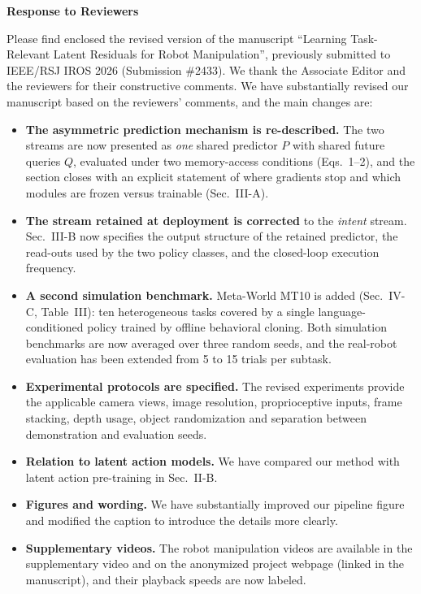 \documentclass[11pt,a4paper]{article}
\begin{document}
\begin{center}
{\Large\bfseries Response to Reviewers}\\[4pt]
\end{center}

\vspace{6pt}
\noindent
Please find enclosed the revised version of the manuscript ``Learning Task-Relevant Latent Residuals for Robot Manipulation'', previously submitted to IEEE/RSJ IROS 2026 (Submission \#2433). We thank the Associate Editor and the reviewers for their constructive comments. We have substantially revised our manuscript based on the reviewers' comments, and the main changes are:

\begin{itemize}[leftmargin=1.4em,itemsep=2pt,topsep=4pt]
  \item \textbf{The asymmetric prediction mechanism is re-described.} The two streams are now presented as \emph{one} shared predictor $P$ with shared future queries $Q$, evaluated under two memory-access conditions (Eqs.~1--2), and the section closes with an explicit statement of where gradients stop and which modules are frozen versus trainable (Sec.~III-A).
  \item \textbf{The stream retained at deployment is corrected} to the \emph{intent} stream. Sec.~III-B now specifies the output structure of the retained predictor, the read-outs used by the two policy classes, and the closed-loop execution frequency.
  \item \textbf{A second simulation benchmark.} Meta-World MT10 is added (Sec.~IV-C, Table~III): ten heterogeneous tasks covered by a single language-conditioned policy trained by offline behavioral cloning. Both simulation benchmarks are now averaged over three random seeds, and the real-robot evaluation has been extended from 5 to 15 trials per subtask.
  \item \textbf{Experimental protocols are specified.} The revised experiments provide the applicable camera views, image resolution, proprioceptive inputs, frame stacking, depth usage, object randomization and separation between demonstration and evaluation seeds.
  \item \textbf{Relation to latent action models.} We have compared our method with latent action pre-training in Sec.~II-B.
  \item \textbf{Figures and wording.} We have substantially improved our pipeline figure and modified the caption to introduce the details more clearly.
  \item \textbf{Supplementary videos.} The robot manipulation videos are available in the supplementary video and on the anonymized project webpage (linked in the manuscript), and their playback speeds are now labeled.
\end{itemize}
\end{document}
